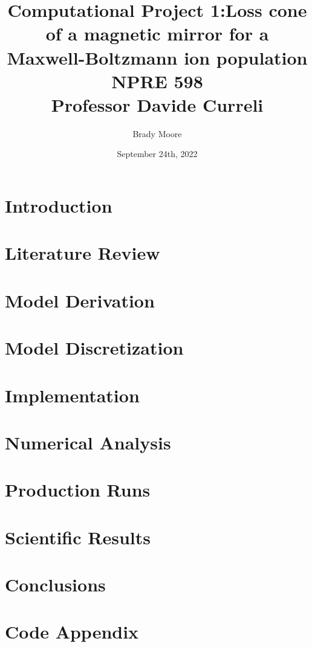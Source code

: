 \documentclass[titlepage]{article}
\title{Computational Project 1:Loss cone of a magnetic mirror for a Maxwell-Boltzmann ion population\\
    \large NPRE 598 \\
    Professor Davide Curreli}
\date{September 24th, 2022}
\author{Brady Moore}
\begin{document}
\maketitle
\begin{abstract}
\end{abstract}
\section{Introduction}
\section{Literature Review}
\section{Model Derivation}
\section{Model Discretization}
\section{Implementation}
\section{Numerical Analysis}
\section{Production Runs}
\section{Scientific Results}
\section{Conclusions}



\section{Code Appendix}
\end{document}
